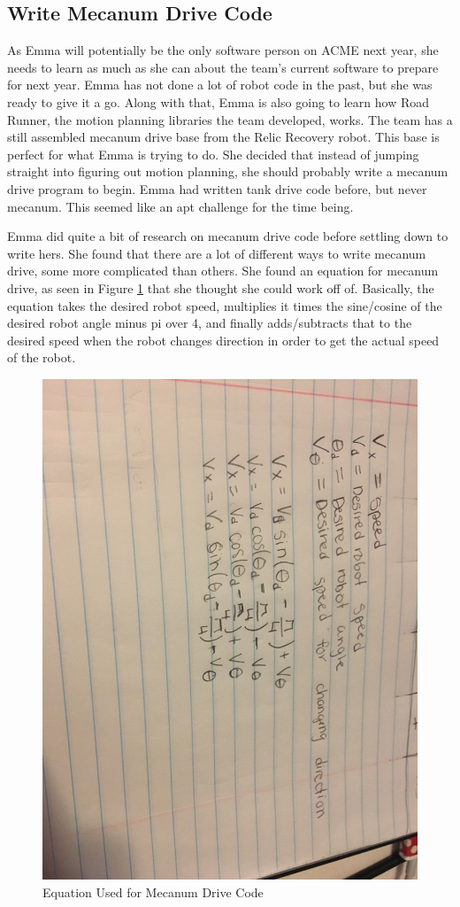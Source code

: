 \documentclass{article}
\begin{document}
\subsection{Write Mecanum Drive Code}
As Emma will potentially be the only software person on ACME next year, she needs to learn as much as she can about the team's current software to prepare for next year. Emma has not done a lot of robot code in the past, but she was ready to give it a go. Along with that, Emma is also going to learn how Road Runner, the motion planning libraries the team developed, works. The team has a still assembled mecanum drive base from the Relic Recovery robot. This base is perfect for what Emma is trying to do. She decided that instead of jumping straight into figuring out motion planning, she should probably write a mecanum drive program to begin. Emma had written tank drive code before, but never mecanum. This seemed like an apt challenge for the time being. 

Emma did quite a bit of research on mecanum drive code before settling down to write hers. She found that there are a lot of different ways to write mecanum drive, some more complicated than others. She found an equation for mecanum drive, as seen in Figure \ref{fig:equation} that she thought she could work off of. Basically, the equation takes the desired robot speed, multiplies it times the sine/cosine of the desired robot angle minus pi over 4, and finally adds/subtracts that to the desired speed when the robot changes direction in order to get the actual speed of the robot. 

\begin{figure}
    \centering
    \includegraphics[width= 0.5 \textwidth, angle=90 ] {29_03-18/images/equation.JPG}
    \caption{Equation Used for Mecanum Drive Code}
    \label{fig:equation}
\end{figure}
\end{document}
